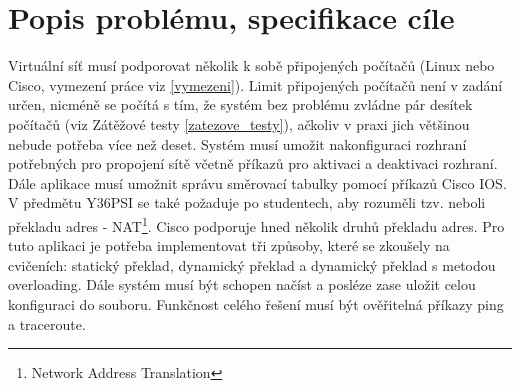 \chapter{Popis problému, specifikace cíle}


Virtuální síť musí podporovat několik k sobě připojených počítačů (Linux nebo Cisco, vymezení práce viz \ref{vymezeni}). Limit připojených počítačů není v zadání určen, nicméně se počítá s tím, že systém bez problému zvládne pár desítek počítačů (viz Zátěžové testy \ref{zatezove_testy}), ačkoliv v praxi jich většinou nebude potřeba více než deset. Systém musí umožit nakonfiguraci rozhraní potřebných pro propojení sítě včetně příkazů pro aktivaci a deaktivaci rozhraní. Dále aplikace musí umožnit správu směrovací tabulky pomocí příkazů Cisco IOS. V předmětu Y36PSI se také požaduje po studentech, aby rozuměli tzv.  neboli překladu adres - NAT\footnote{Network Address Translation}. Cisco podporuje hned několik druhů překladu adres. Pro tuto aplikaci je potřeba implementovat tři způsoby, které se zkoušely na cvičeních: statický překlad, dynamický překlad a dynamický překlad s metodou overloading. Dále systém musí být schopen načíst a posléze zase uložit celou konfiguraci do souboru. Funkčnost celého řešení musí být ověřitelná příkazy ping a traceroute.

